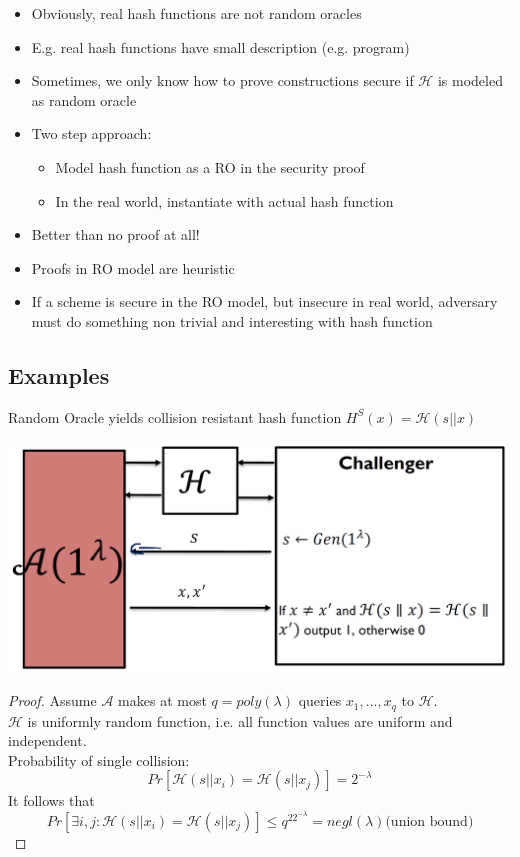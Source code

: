 	\begin{itemize}
	    \item Obviously, real hash functions are not random oracles
	    \item E.g. real hash functions have small description (e.g. program)
	    \item Sometimes, we only know how to prove constructions secure if $\mathcal{H}$ is modeled as random oracle
	    \item Two step approach:
	    \begin{itemize}
	        \item Model hash function as a RO in the security proof
	        \item In the real world, instantiate with actual hash function
	    \end{itemize}
	    \item Better than no proof at all!
	    \item Proofs in RO model are heuristic
	    \item If a scheme is secure in the RO model, but insecure in real world, adversary must do something non trivial and interesting with hash function
	\end{itemize}

	\subsection{Examples}
		Random Oracle yields collision resistant hash function $H^S(x) = \mathcal{H}(s||x)$
	   	\begin{center}
			\includegraphics[width=140mm]{Graphics/Hash Functions/hf4.png}
		\end{center}
		\begin{proof}
			Assume $\mathcal{A}$ makes at most $q=poly(\lambda)$ queries $x_1,...,x_q$ to $\mathcal{H}$.\\
			$\mathcal{H}$ is uniformly random function, i.e. all function values are uniform and independent.\\
			Probability of single collision:
			$$Pr[\mathcal{H}(s||x_i) = \mathcal{H}(s||x_j)] = 2^{-\lambda}$$
			It follows that
			$$Pr[\exists i,j: \mathcal{H}(s||x_i) = \mathcal{H}(s||x_j)] \leq q^22^{-\lambda} = negl(\lambda) \text{(union bound)}$$
		\end{proof}

